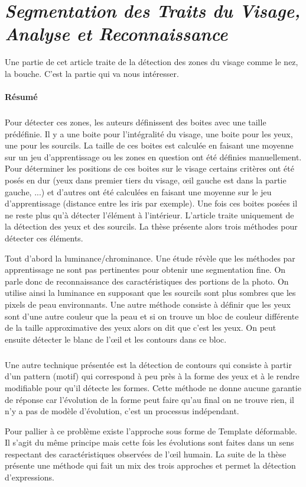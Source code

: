 \documentclass[11pt, french]{report-rd-info}
\begin{document}
\section{\emph{Segmentation des Traits du Visage, Analyse et Reconnaissance}}
Une partie de cet article\cite{Cognitives2006} traite de la détection des zones du visage comme le nez, la bouche. C'est la partie qui va nous intéresser.

\paragraph{Résumé}
\subparagraph{}
Pour détecter ces zones, les auteurs définissent des boites avec une taille prédéfinie. Il y a une boite pour l'intégralité du visage, une boite pour les yeux, une pour les sourcils. La taille de ces boites est calculée en faisant une moyenne sur un jeu d'apprentissage ou les zones en question ont été définies manuellement.
Pour déterminer les positions de ces boites sur le visage certains critères ont été posés en dur (yeux dans premier tiers du visage, œil gauche est dans la partie gauche, ...) et d'autres ont été calculées en faisant une moyenne sur le jeu d'apprentissage (distance entre les iris par exemple).
Une fois ces boites posées il ne reste plus qu'à détecter l'élément à l’intérieur.
L'article traite uniquement de la détection des yeux et des sourcils.
La thèse présente alors trois méthodes pour détecter ces éléments.

Tout d'abord la luminance/chrominance. Une étude révèle que les méthodes par apprentissage ne sont pas pertinentes pour obtenir une segmentation fine. On parle donc de reconnaissance des caractéristiques des portions de la photo. On utilise ainsi la luminance en supposant que les sourcils sont plus sombres que les pixels de peau environnants.
Une autre méthode consiste à définir que les yeux sont d'une autre couleur que la peau et si on trouve un bloc de couleur différente de la taille approximative des yeux alors on dit que c'est les yeux. On peut ensuite détecter le blanc de l'œil et les contours dans ce bloc.
\subparagraph{}
Une autre technique présentée est la détection de contours qui consiste à partir d'un pattern (motif) qui correspond à peu près à la forme des yeux et à le rendre modifiable pour qu'il détecte les formes. Cette méthode ne donne aucune garantie de réponse car l'évolution de la forme peut faire qu'au final on ne trouve rien, il n'y a pas de modèle d'évolution, c'est un processus indépendant.

Pour pallier à ce problème existe l'approche sous forme de Template déformable. Il s'agit du même principe mais cette fois les évolutions sont faites dans un sens respectant des caractéristiques observées de l'œil humain. La suite de la thèse présente une méthode qui fait un mix des trois approches et permet la détection d'expressions.
\end{document}
